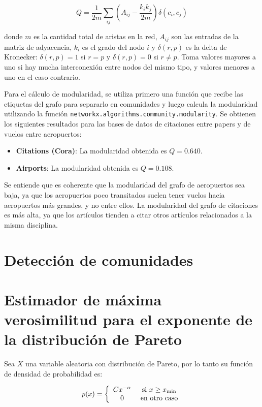 \documentclass{article}
\begin{document}
$$Q = \frac{1}{2m} \sum_{ij} \left(A_{ij} -\frac{k_ik_j}{2m} \right)\delta(c_i,c_j)$$

donde $m$ es la cantidad total de aristas en la red, $A_{ij}$ son las entradas de la matriz de adyacencia, $k_i$ es el grado del nodo $i$ y $\delta(r,p)$ es la delta de Kronecker: $\delta(r,p) = 1$ si $r=p$ y $\delta(r,p) = 0$ si $r\neq p$. Toma valores mayores a uno si hay mucha interconexión entre nodos del mismo tipo, y valores menores a uno en el caso contrario.


Para el cálculo de modularidad, se utiliza primero una función que recibe las etiquetas del grafo para separarlo en comunidades y luego calcula la modularidad utilizando la función \verb|networkx.algorithms.community.modularity|. Se obtienen los siguientes resultados para las bases de datos de citaciones entre papers y de vuelos entre aeropuertos:
\begin{itemize}
    \item \textbf{Citations (Cora)}: La modularidad obtenida es $Q = 0.640$.
    \item \textbf{Airports}: La modularidad obtenida es $Q = 0.108$.
\end{itemize}

Se entiende que es coherente que la modularidad del grafo de aeropuertos sea baja, ya que los aeropuertos poco transitados suelen tener vuelos hacia aeropuertos más grandes, y no entre ellos. La modularidad del grafo de citaciones es más alta, ya que los artículos tienden a citar otros artículos relacionados a la misma disciplina.

\section{Detección de comunidades} \label{sec: comunidades}



\section{Estimador de máxima verosimilitud para el exponente de la distribución de Pareto} \label{sec: pareto}

Sea $X$ una variable aleatoria con distribución de Pareto, por lo tanto su función de densidad de probabilidad es:

$$p(x) = \left\lbrace \begin{array}{c c} C x^{-\alpha} & \text{ si } x\geq x_\text{min} \\ 0 & \text{ en otro caso} \end{array}\right.$$
\end{document}
